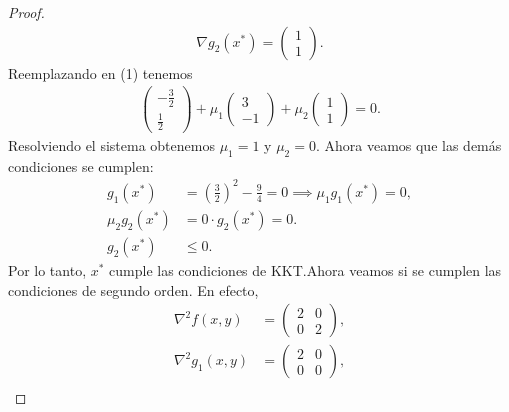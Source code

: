 \documentclass{article}
\begin{document}
\begin{proof}
\begin{align*}
        \nabla g_2(x^*)  = \begin{pmatrix}
                               1 \\
                               1
                           \end{pmatrix}.
    \end{align*}
    Reemplazando en (1) tenemos \begin{align*}
        \begin{pmatrix}
            -\frac{3}{2} \\
            \frac{1}{2}
        \end{pmatrix} + \mu_1 \begin{pmatrix}
                                  3 \\
                                  -1
                              \end{pmatrix} + \mu_2 \begin{pmatrix}
                                                        1 \\
                                                        1
                                                    \end{pmatrix} = 0.
    \end{align*}
    Resolviendo el sistema obtenemos \( \mu_1 = 1 \) y \( \mu_2 = 0 \). Ahora veamos que las demás condiciones se cumplen: \begin{align*}
        g_1(x^*)       & = {\left( \frac{3}{2} \right)}^2 - \frac{9}{4} = 0 \implies \mu_1 g_1(x^*) = 0, \\
        \mu_2 g_2(x^*) & = 0 \cdot g_2(x^*) = 0.                                                         \\
        g_2(x^*)       & \leq 0.
    \end{align*}
    Por lo tanto, \( x^* \) cumple las condiciones de KKT.\@ Ahora veamos si se cumplen las condiciones de segundo orden. En efecto, \begin{align*}
        \nabla^2 f(x, y)   & = \begin{pmatrix}
                                   2 & 0 \\
                                   0 & 2
                               \end{pmatrix}, \\
        \nabla^2 g_1(x, y) & = \begin{pmatrix}
                                   2 & 0 \\
                                   0 & 0
                               \end{pmatrix}, \\

\end{align*}
\end{proof}
\end{document}
